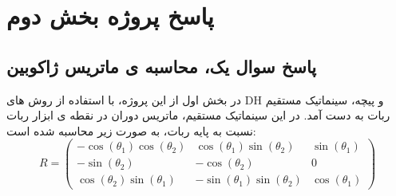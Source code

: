 
\chapter*{پاسخ پروژه بخش دوم}
\section*{پاسخ سوال یک، محاسبه ی ماتریس ژاکوبین}

در بخش اول از این پروژه، با استفاده از روش های DH و پیچه، سینماتیک مستقیم ربات به دست آمد. در این سینماتیک مستقیم، ماتریس دوران در نقطه ی ابزار ربات نسبت به پایه ربات، به صورت زیر محاسبه شده است:
\[
R = 
\begin{pmatrix}
	-\cos(\theta_1)\cos(\theta_2) & \cos(\theta_1)\sin(\theta_2) & \sin(\theta_1) \\
	-\sin(\theta_2) & -\cos(\theta_2) & 0 \\
	\cos(\theta_2)\sin(\theta_1) & -\sin(\theta_1)\sin(\theta_2) & \cos(\theta_1)
\end{pmatrix}
\]
